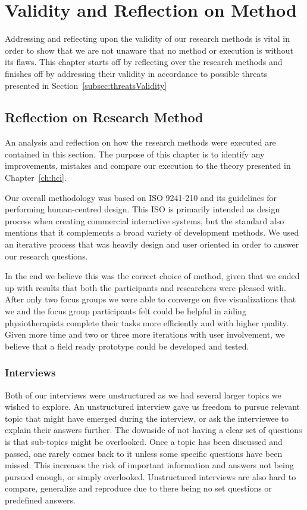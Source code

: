 \chapter{Validity and Reflection on Method}
Addressing and reflecting upon the validity of our research methods is vital in order to show that we are not unaware that no method or execution is without its flaws. This chapter starts off by reflecting over the research methods and finishes off by addressing their validity in accordance to possible threats presented in Section~\ref{subsec:threatsValidity} 

\section{Reflection on Research Method}
An analysis and reflection on how the research methods were executed are contained in this section. The purpose of this chapter is to identify any improvements, mistakes and compare our execution to the theory presented in Chapter~\ref{ch:hci}.

Our overall methodology was based on ISO 9241-210 and its guidelines for performing human-centred design. This ISO is primarily intended as design process when creating commercial interactive systems, but the standard also mentions that it complements a broad variety of development methods. We used an iterative process that was heavily design and user oriented in order to answer our research questions.

In the end we believe this was the correct choice of method, given that we ended up with results that both the participants and researchers were pleased with. After only two focus groups we were able to converge on five visualizations that we and the focus group participants felt could be helpful in aiding physiotherapists complete their tasks more efficiently and with higher quality. Given more time and two or three more iterations with user involvement, we believe that a field ready prototype could be developed and tested.

\subsection{Interviews}
Both of our interviews were unstructured as we had several larger topics we wished to explore. An unstructured interview gave us freedom to pursue relevant topic that might have emerged during the interview, or ask the interviewee to explain their answers further. The downside of not having a clear set of questions is that sub-topics might be overlooked. Once a topic has been discussed and passed, one rarely comes back to it unless some specific questions have been missed. This increases the risk of important information and answers not being pursued enough, or simply overlooked. Unstructured interviews are also hard to compare, generalize and reproduce due to there being no set questions or predefined answers.

